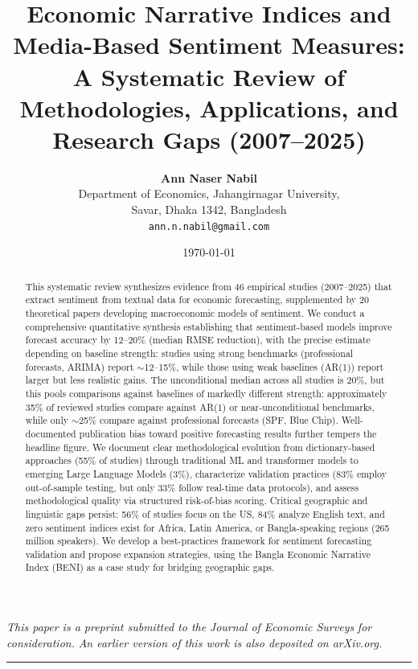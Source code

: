 \documentclass[11pt,twocolumn]{article}
\title{\textbf{Economic Narrative Indices and Media-Based Sentiment Measures:\\
A Systematic Review of Methodologies, Applications, and Research Gaps (2007--2025)}}
\author{\textbf{Ann Naser Nabil}\orcidlink{0009-0006-3561-045X}\\[4pt]
  \small Department of Economics, Jahangirnagar University,\\
  \small Savar, Dhaka 1342, Bangladesh\\
  \small \texttt{ann.n.nabil@gmail.com}}
\date{\today}
\begin{document}
\maketitle

\noindent\small\textit{This paper is a preprint submitted to the}
\textit{Journal of Economic Surveys}
\textit{for consideration.}
\textit{An earlier version of this work is also deposited on arXiv.org.}
\par\vspace{0.5em}

\hrule\vspace{1em}

\begin{abstract}
This systematic review synthesizes evidence from 46 empirical studies (2007--2025) that extract sentiment from textual data for economic forecasting, supplemented by 20 theoretical papers developing macroeconomic models of sentiment. We conduct a comprehensive quantitative synthesis establishing that sentiment-based models improve forecast accuracy by 12--20\% (median RMSE reduction), with the precise estimate depending on baseline strength: studies using strong benchmarks (professional forecasts, ARIMA) report $\sim$12--15\%, while those using weak baselines (AR(1)) report larger but less realistic gains. The unconditional median across all studies is 20\%, but this pools comparisons against baselines of markedly different strength: approximately 35\% of reviewed studies compare against AR(1) or near-unconditional benchmarks, while only $\sim$25\% compare against professional forecasts (SPF, Blue Chip). Well-documented publication bias toward positive forecasting results further tempers the headline figure. We document clear methodological evolution from dictionary-based approaches (55\% of studies) through traditional ML and transformer models to emerging Large Language Models (3\%), characterize validation practices (83\% employ out-of-sample testing, but only 33\% follow real-time data protocols), and assess methodological quality via structured risk-of-bias scoring. Critical geographic and linguistic gaps persist: 56\% of studies focus on the US, 84\% analyze English text, and zero sentiment indices exist for Africa, Latin America, or Bangla-speaking regions (265 million speakers). We develop a best-practices framework for sentiment forecasting validation and propose expansion strategies, using the Bangla Economic Narrative Index (BENI) as a case study for bridging geographic gaps.
\end{abstract}
\end{document}
